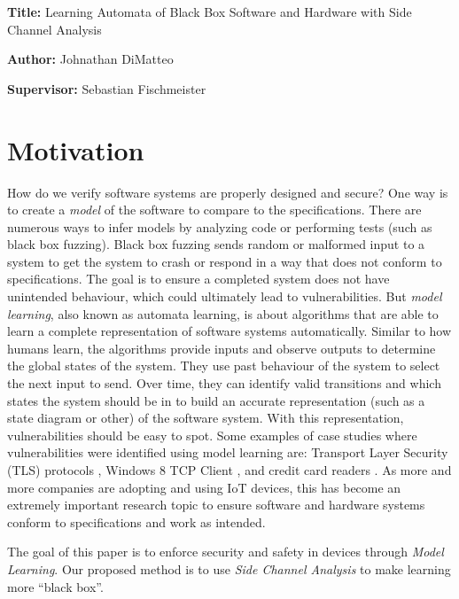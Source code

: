 \documentclass[11pt, a4paper]{article}
\newcommand{\namelistlabel}[1]{\mbox{#1}\hfil}
\newenvironment{namelist}[1]{%
\begin{list}{}
    {
        \let\makelabel\namelistlabel
        \settowidth{\labelwidth}{#1}
        \setlength{\leftmargin}{1.1\labelwidth}
    }
  }{%
\end{list}}
\begin{document}
\begin{namelist}{xxxxxxxxxxxx}
\item[{\bf Title:}]
    Learning Automata of Black Box Software and Hardware with Side Channel Analysis
\item[{\bf Author:}]
	Johnathan DiMatteo
\item[{\bf Supervisor:}]
	Sebastian Fischmeister
\end{namelist}

\section*{Motivation}
How do we verify software systems are properly designed and secure?
One way is to create a \textit{model} of the software to compare to the specifications.
There are numerous ways to infer models by analyzing code or performing tests (such as black box fuzzing).
Black box fuzzing sends random or malformed input to a system to get the system to crash or respond in a way that does not conform to specifications.
The goal is to ensure a completed system does not have unintended behaviour, which could ultimately lead to vulnerabilities.
But \textit{model learning}, also known as automata learning, is about algorithms that are able to learn a complete representation of software systems automatically.
Similar to how humans learn, the algorithms provide inputs and observe outputs to determine the global states of the system.
They use past behaviour of the system to select the next input to send.
Over time, they can identify valid transitions and which states the system should be in to build an accurate representation (such as a state diagram or other) of the software system.
With this representation, vulnerabilities should be easy to spot.
Some examples of case studies where vulnerabilities were identified using model learning are: Transport Layer Security (TLS) protocols \cite{TLS}, Windows 8 TCP Client \cite{fiteruau2016combining}, and credit card readers \cite{chalupar2014automated}. 
As more and more companies are adopting and using IoT devices, this has become an extremely important research topic to ensure software and hardware systems conform to specifications and work as intended.

The goal of this paper is to enforce security and safety in devices through \textit{Model Learning}.
Our proposed method is to use \textit{Side Channel Analysis} to make learning more ``black box''.
\end{document}

